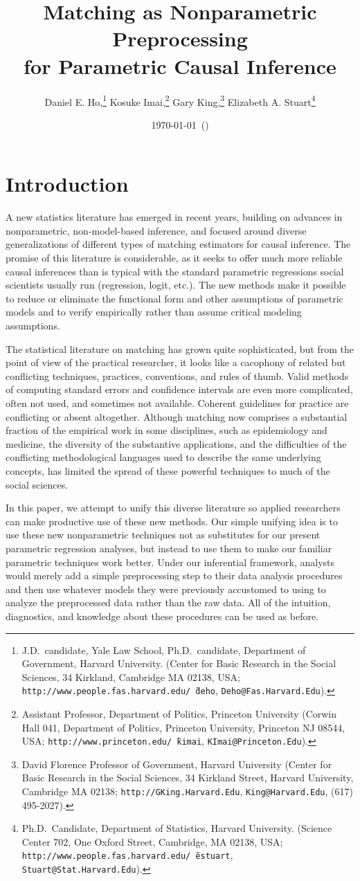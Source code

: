 \documentclass[11pt,titlepage]{article}
\title{Matching as Nonparametric Preprocessing\\
for Parametric Causal Inference}
\author{Daniel E. Ho,\thanks{J.D.\ candidate, Yale Law School, Ph.D.\
    candidate, Department of Government, Harvard
    University. (Center for Basic Research in the Social Sciences, 34
    Kirkland, Cambridge MA 02138, USA;
    \texttt{http://www.people.fas.harvard.edu/\~\,deho},
    \texttt{Deho@Fas.Harvard.Edu}).}
Kosuke Imai,\thanks{Assistant Professor, Department of Politics, Princeton
    University (Corwin Hall 041, Department of Politics, Princeton
    University, Princeton NJ 08544, USA;
    \texttt{http://www.princeton.edu/\~\,kimai},
    \texttt{KImai@Princeton.Edu}).}
Gary King,\thanks{David Florence Professor of Government, Harvard
  University (Center for Basic Research in the Social Sciences, 34
  Kirkland Street, Harvard University, Cambridge MA 02138;
  \texttt{http://GKing.Harvard.Edu}, \texttt{King@Harvard.Edu}, (617)
  495-2027).}
Elizabeth A. Stuart\thanks{Ph.D.\ Candidate, Department of Statistics, Harvard
  University. (Science Center 702, One Oxford Street, Cambridge, MA
  02138, USA;
  \texttt{http://www.people.fas.harvard.edu/\~\,estuart},
  \texttt{Stuart@Stat.Harvard.Edu}).}}
\date{\today\ (\printtime)}
\begin{document}
\maketitle

\begin{abstract}

\end{abstract}
\baselineskip

\section{Introduction}

A new statistics literature has emerged in recent years, building on
advances in nonparametric, non-model-based inference, and focused
around diverse generalizations of different types of matching
estimators for causal inference.  The promise of this literature is
considerable, as it seeks to offer much more reliable causal
inferences than is typical with the standard parametric regressions
social scientists usually run (regression, logit, etc.).  The new
methods make it possible to reduce or eliminate the functional form
and other assumptions of parametric models and to verify empirically
rather than assume critical modeling assumptions.

The statistical literature on matching has grown quite sophisticated,
but from the point of view of the practical researcher, it looks like
a cacophony of related but conflicting techniques, practices,
conventions, and rules of thumb.  Valid methods of computing standard
errors and confidence intervals are even more complicated, often not
used, and sometimes not available.  Coherent guidelines for practice
are conflicting or absent altogether.  Although matching now comprises
a substantial fraction of the empirical work in some disciplines, such
as epidemiology and medicine, the diversity of the substantive
applications, and the difficulties of the conflicting methodological
languages used to describe the same underlying concepts, has limited
the spread of these powerful techniques to much of the social
sciences.

In this paper, we attempt to unify this diverse literature so applied
researchers can make productive use of these new methods.  Our simple
unifying idea is to use these new nonparametric techniques not as
substitutes for our present parametric regression analyses, but
instead to use them to make our familiar parametric techniques work
better.  Under our inferential framework, analysts would merely add a
simple preprocessing step to their data analysis procedures and then
use whatever models they were previously accustomed to using to
analyze the preprocessed data rather than the raw data.  All of the
intuition, diagnostics, and knowledge about these procedures can be
used as before.  
\end{document}
